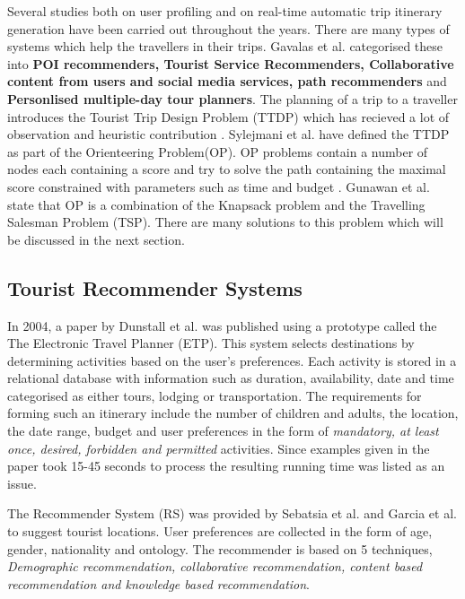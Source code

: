 Several studies both on user profiling and on real-time automatic trip
itinerary generation have been carried out throughout the years. There
are many types of systems which help the travellers in their trips.
Gavalas et al. \cite{Gavalas2014} categorised these into \textbf{POI
recommenders, Tourist Service Recommenders, Collaborative content from
users and social media services, path recommenders} and
\textbf{Personlised multiple-day tour planners}. The planning of a
trip to a traveller introduces the Tourist Trip Design Problem (TTDP)
which has recieved a lot of observation and heuristic contribution
\cite{Gunawan2016,Delic2018}. Sylejmani et al.\cite{Sylejmani2017}
have defined the TTDP as part of the Orienteering Problem(OP). OP
problems contain a number of nodes each containing a score and try to
solve the path containing the maximal score constrained with
parameters such as time and budget \cite{Gunawan2016}. Gunawan et al.
\cite{Gunawan2016} state that OP is a combination of the Knapsack
problem and the Travelling Salesman Problem (TSP). There are many
solutions to this problem which will be discussed in the next section.

\subsection{Tourist Recommender Systems}

    In 2004, a paper by Dunstall et al. \cite{DUNSTALL2008a} was
    published using a prototype called the The Electronic Travel
    Planner (ETP). This system selects destinations by determining
    activities based on the user’s preferences. Each activity is
    stored in a relational database with information such as duration,
    availability, date and time categorised as either tours, lodging
    or transportation. The requirements for forming such an itinerary
    include the number of children and adults, the location, the date
    range, budget and user preferences in the form of \emph{mandatory,
    at least once, desired, forbidden and permitted} activities. Since
    examples given in the paper took 15-45 seconds to process the
    resulting running time was listed as an issue.

    The Recommender System (RS) was provided by Sebatsia et al.
    \cite{Sebastia2009a} and Garcia et al. \cite{Garcia2011} to
    suggest tourist locations. User preferences are collected in the
    form of age, gender, nationality and ontology. The recommender is
    based on 5 techniques, \emph{Demographic recommendation,
    collaborative recommendation, content based recommendation and
    knowledge based recommendation}. 

